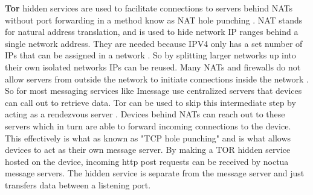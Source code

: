 \documentclass[../main/main.tex]{subfiles}
\begin{document}
\textbf{Tor} hidden services are used to facilitate connections to servers behind NATs without port forwarding in a method know as NAT hole punching \cite{TCP}. 
NAT stands for natural address translation, and is used to hide network IP ranges behind a single network address. 
They are needed because IPV4 only has a set number of IPs that can be assigned in a network \cite{NAT}. 
So by splitting larger networks up into their own isolated networks IPs can be reused. 
Many NATs and firewalls do not allow servers from outside the network to initiate connections inside the network \cite{NAT}. 
So for most messaging services like Imessage use centralized servers that devices can call out to retrieve data. 
Tor can be used to skip this intermediate step by acting as a rendezvous server \cite{TOR}. 
Devices behind NATs can reach out to these servers which in turn are able to forward incoming connections to the device.
This effectively is what as known as "TCP hole punching" and is what allows devices to act as their own message server. 
By making a TOR hidden service hosted on the device, incoming http post requests can be received by noctua message servers. 
The hidden service is separate from the message server and just transfers data between a listening port.
\end{document}
